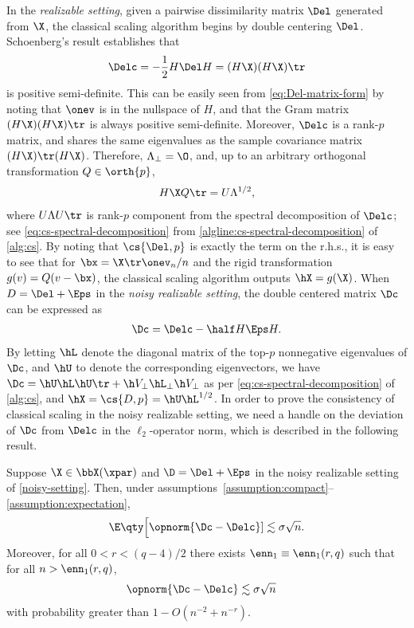 \documentclass[10pt]{article}
\begin{document}
In the \textit{realizable setting}, given a pairwise dissimilarity matrix $\Del$ generated from $\X$, the classical scaling algorithm begins by double centering $\Del$. Schoenberg's result establishes that
\begin{align}
    \Delc  = -\frac{1}{2}H\Del H = (H\X)(H\X)\tr
\end{align}
is positive semi-definite. This can be easily seen from \cref{eq:Del-matrix-form} by noting that  $\onev$ is in the nullspace of $H$, and that the Gram matrix $(H\X)(H\X)\tr$ is always positive semi-definite. Moreover, $\Delc$ is a rank-$p$ matrix, and shares the same eigenvalues as the sample covariance matrix $(H\X)\tr(H\X)$. Therefore, $\Lambda_\perp = \O$, and, up to an arbitrary orthogonal transformation $Q \in \orth{p}$, 
\begin{align}
    H\X Q\tr = U\Lambda^{1/2},\label{eq:cs-exact-recovery}
\end{align}
where $U\Lambda U\tr$ is rank-$p$ component from the spectral decomposition of $\Delc$; see \cref{eq:cs-spectral-decomposition} from \cref{algline:cs-spectral-decomposition} of \cref{alg:cs}. By noting that $\cs{\Del, p}$ is exactly the term on the r.h.s., it is easy to see that for $\bx = \X\tr\onev_n/n$ and the rigid transformation $g(v) = Q(v - \bx)$, the classical scaling algorithm outputs $\hX = g(\X)$. When $D = \Del + \Eps$ in the \textit{noisy realizable setting}, the double centered matrix $\Dc$ can be expressed as
\begin{align}\label{eq:Dc}
    \Dc = \Delc - \half H\Eps H.
\end{align}
By letting $\hL$ denote the diagonal matrix of the top-$p$ nonnegative eigenvalues of $\Dc$, and $\hU$ to denote the corresponding eigenvectors, we have $\Dc = \hU \hL \hU\tr + \h V_\perp \hL_\perp \h V_\perp$ as per \cref{eq:cs-spectral-decomposition} of \cref{alg:cs}, and $\hX = \cs{D, p} = \hU \hL^{1/2}$. In order to prove the consistency of classical scaling in the noisy realizable setting, we need a handle on the deviation of $\Dc$ from $\Delc$ in the $\ell_2$-operator norm, which is described in the following result.

\begin{theorem}\label{lem:D-opnorm}
    Suppose $\X \in \bbX(\xpar)$ and $\D = \Del + \Eps$ in the noisy realizable setting of \cref{noisy-setting}. Then, under assumptions~\ref{assumption:compact}--\ref{assumption:expectation}, 
    \begin{align}
        \E\qty\Big[ \opnorm{\Dc - \Delc} ] \lesssim \sigma\sqrt{n}.\label{eq:D-opnorm-2}
    \end{align}
    Moreover, for all $0 < r < (q-4)/2$ there exists $\enn_1 \equiv \enn_1(r, q)$ such that for all $n > \enn_1(r, q)$,
    \begin{align}
        \opnorm{ \Dc - \Delc } &\lesssim \sigma\sqrt{n}\label{eq:D-opnorm-1}
    \end{align}
    with probability greater than $1 - O(n^{-2} + n^{-r})$.
\end{theorem}
\end{document}
